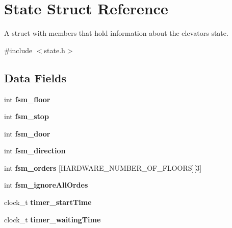 \hypertarget{structState}{}\section{State Struct Reference}
\label{structState}


A struct with members that hold information about the elevators state.  




{\ttfamily \#include $<$state.\+h$>$}

\subsection*{Data Fields}
\begin{DoxyCompactItemize}
\item 
\mbox{\label{structState_a881e39b29ca021715cbb5f5a472c140f}} 
int {\bfseries fsm\+\_\+floor}
\item 
\mbox{\label{structState_af805fd2224548bc74d5cb977da399b1c}} 
int {\bfseries fsm\+\_\+stop}
\item 
\mbox{\label{structState_aa1944221a61f699959e2dd2fb29537b1}} 
int {\bfseries fsm\+\_\+door}
\item 
\mbox{\label{structState_a80de292fc4b9c7f578c61102b5ef6acc}} 
int {\bfseries fsm\+\_\+direction}
\item 
\mbox{\label{structState_a486ebfe1ed84af6f4a04ac0c498d8fd9}} 
int {\bfseries fsm\+\_\+orders} \mbox{[}H\+A\+R\+D\+W\+A\+R\+E\+\_\+\+N\+U\+M\+B\+E\+R\+\_\+\+O\+F\+\_\+\+F\+L\+O\+O\+RS\mbox{]}\mbox{[}3\mbox{]}
\item 
\mbox{\label{structState_a81de86f445c82ce699a6250961dcffce}} 
int {\bfseries fsm\+\_\+ignore\+All\+Ordes}
\item 
\mbox{\label{structState_a88bfd697dae6255ef2164c2025073a5b}} 
clock\+\_\+t {\bfseries timer\+\_\+start\+Time}
\item 
\mbox{\label{structState_aded80ff67ae02afeebddbc45dd905160}} 
clock\+\_\+t {\bfseries timer\+\_\+waiting\+Time}
\end{DoxyCompactItemize}


